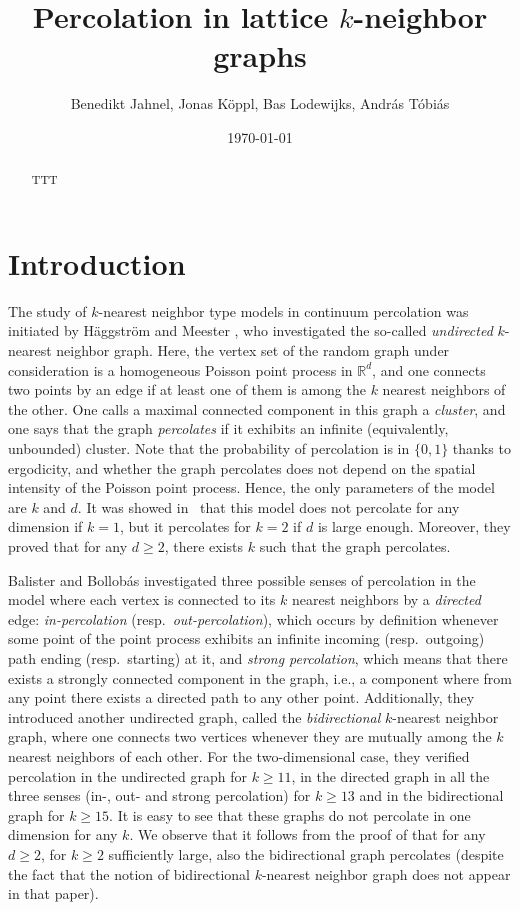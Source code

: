 \documentclass{article}
\title{Percolation in lattice $k$-neighbor graphs}
\author{Benedikt Jahnel, Jonas K\"oppl, Bas Lodewijks, Andr\'as T\'obi\'as}
\date{\today}
\theoremstyle{definition}
\newcommand{\1}{\mathbbm{1}}
\newcommand{\0}{\mathbf{o}}
\newcommand{\R}{\mathbb{R}}
\begin{document}
\maketitle

\begin{abstract}TTT
\end{abstract}

\section{Introduction}
The study of $k$-nearest neighbor type models in continuum percolation was initiated by Häggström and Meester \cite{HaggMee96}, who investigated the so-called \emph{undirected} $k$-nearest neighbor graph. Here, the vertex set of the random graph under consideration is a homogeneous Poisson point process in $\R^d$, and one connects two points by an edge if at least one of them is among the $k$ nearest neighbors of the other. One calls a maximal connected component in this graph a \emph{cluster}, and one says that the graph \emph{percolates} if it exhibits an infinite (equivalently, unbounded) cluster. Note that the probability of percolation is in $\{0,1\}$ thanks to ergodicity, and whether the graph percolates does not depend on the spatial intensity of the Poisson point process. Hence, the only parameters of the model are $k$ and $d$. It was showed in~\cite{HaggMee96} that this model does not percolate for any dimension if $k = 1$, but it percolates for $k=2$ if $d$ is large enough. Moreover, they proved that for any $d \geq 2$, there exists $k$ such that the graph percolates.

Balister and Bollobás \cite{BalisterBollobas13} investigated three possible senses of percolation in the model where each vertex is connected  to its $k$ nearest neighbors by a \emph{directed} edge: \emph{in-percolation} (resp.\ \emph{out-percolation}), which occurs by definition whenever some point of the point process exhibits an infinite incoming (resp.\ outgoing) path ending (resp.\ starting) at it, and \emph{strong percolation}, which means that there exists a strongly connected component in the graph, i.e., a component where from any point there exists a directed path to any other point. Additionally, they introduced another undirected graph, called the \emph{bidirectional} $k$-nearest neighbor graph, where one connects two vertices whenever they are mutually among the $k$ nearest neighbors of each other. For the two-dimensional case, they verified percolation in the undirected graph for $k \geq 11$, in the directed graph in all the three senses (in-, out- and strong percolation) for $k \geq 13$ and in the bidirectional graph for $k \geq 15$. It is easy to see that these graphs do not percolate in one dimension for any $k$. We observe that it follows from the proof of \cite[Theorem 2.2]{HaggMee96} that for any $d\geq 2$, for $k \geq 2$ sufficiently large, also the bidirectional graph percolates (despite the fact that the notion of bidirectional $k$-nearest neighbor graph does not appear in that paper).
\end{document}
